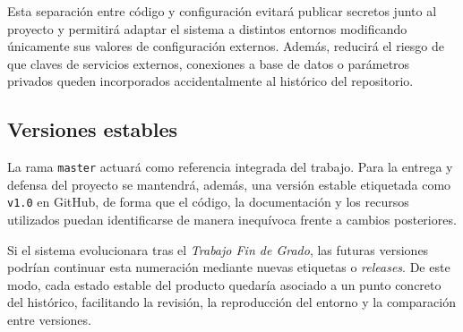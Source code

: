 Esta separación entre código y configuración evitará publicar secretos junto al proyecto y permitirá adaptar el sistema a distintos entornos modificando únicamente sus valores de configuración externos. Además, reducirá el riesgo de que claves de servicios externos, conexiones a base de datos o parámetros privados queden incorporados accidentalmente al histórico del repositorio.

\subsection{Versiones estables}

La rama \texttt{master} actuará como referencia integrada del trabajo. Para la entrega y defensa del proyecto se mantendrá, además, una versión estable etiquetada como \texttt{v1.0} en GitHub, de forma que el código, la documentación y los recursos utilizados puedan identificarse de manera inequívoca frente a cambios posteriores.

Si el sistema evolucionara tras el \textit{Trabajo Fin de Grado}, las futuras versiones podrían continuar esta numeración mediante nuevas etiquetas o \textit{releases}. De este modo, cada estado estable del producto quedaría asociado a un punto concreto del histórico, facilitando la revisión, la reproducción del entorno y la comparación entre versiones.
